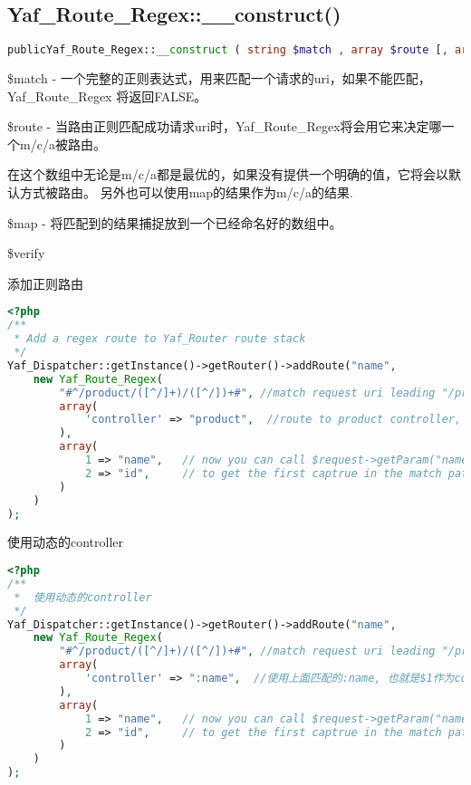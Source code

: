 \subsection{Yaf\_Route\_Regex::\_\_construct()}


\begin{lstlisting}[language=PHP]
publicYaf_Route_Regex::__construct ( string $match , array $route [, array $map [, array $verify ]] )
\end{lstlisting}

\begin{compactitem}
\item \$match - 一个完整的正则表达式，用来匹配一个请求的uri，如果不能匹配，Yaf\_Route\_Regex 将返回FALSE。

\item \$route - 当路由正则匹配成功请求uri时，Yaf\_Route\_Regex将会用它来决定哪一个m/c/a被路由。

在这个数组中无论是m/c/a都是最优的，如果没有提供一个明确的值，它将会以默认方式被路由。 另外也可以使用map的结果作为m/c/a的结果.

\item \$map - 将匹配到的结果捕捉放到一个已经命名好的数组中。

\item \$verify

\end{compactitem}

\begin{example}
添加正则路由
\begin{lstlisting}[language=PHP]
<?php
/**
 * Add a regex route to Yaf_Router route stack
 */
Yaf_Dispatcher::getInstance()->getRouter()->addRoute("name",
    new Yaf_Route_Regex(
        "#^/product/([^/]+)/([^/])+#", //match request uri leading "/product"
        array(
            'controller' => "product",  //route to product controller,
        ),
        array(
            1 => "name",   // now you can call $request->getParam("name")
            2 => "id",     // to get the first captrue in the match pattern.
        )
    )
);
\end{lstlisting}
\end{example}


\begin{example}
使用动态的controller
\begin{lstlisting}[language=PHP]
<?php
/**
 *  使用动态的controller
 */
Yaf_Dispatcher::getInstance()->getRouter()->addRoute("name",
    new Yaf_Route_Regex(
        "#^/product/([^/]+)/([^/])+#", //match request uri leading "/product"
        array(
            'controller' => ":name",  //使用上面匹配的:name, 也就是$1作为controller
        ),
        array(
            1 => "name",   // now you can call $request->getParam("name")
            2 => "id",     // to get the first captrue in the match pattern.
        )
    )
);
\end{lstlisting}
\end{example}



